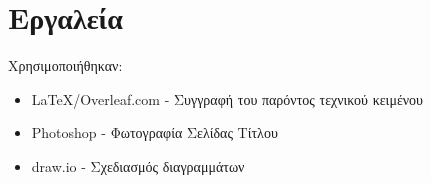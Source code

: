 \documentclass{article}
\begin{document}
\noindent{}
\newpage

\section{Εργαλεία}
Χρησιμοποιήθηκαν:
\begin{itemize}
    \item \LaTeX/Overleaf.com - Συγγραφή του παρόντος τεχνικού κειμένου
    \item Photoshop - Φωτογραφία Σελίδας Τίτλου
    \item draw.io - Σχεδιασμός διαγραμμάτων
\end{itemize}
\end{document}
